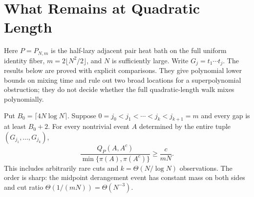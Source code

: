 \section{What Remains at Quadratic Length}
\label{sec:quadratic-diagnostics}

Here $P=P_{N,m}$ is the half-lazy adjacent pair heat bath on the full
uniform identity fiber, $m=2\lfloor N^2/2\rfloor$, and $N$ is sufficiently
large.  Write $G_j=t_1\cdots t_j$.  The results below are proved with
explicit comparisons.  They give polynomial lower bounds on mixing time
and rule out two broad locations for a superpolynomial obstruction; they
do not decide whether the full quadratic-length walk mixes polynomially.

\begin{theorem}
\label{thm:spaced-prefix-cuts}
Put $B_0=\lceil4N\log N\rceil$.  Suppose
$0=j_0<j_1<\cdots<j_k<j_{k+1}=m$ and every gap is at least $B_0+2$.
For every nontrivial event $A$ determined by the entire tuple
$(G_{j_1},\ldots,G_{j_k})$,
\[
 \frac{Q_P(A,A^c)}{\min\{\pi(A),\pi(A^c)\}}
       \ge\frac{c}{mN}.                            \tag{QD.1}
\]
This includes arbitrarily rare cuts and $k=\Theta(N/\log N)$ observations.
The order is sharp: the midpoint derangement event has constant mass on
both sides and cut ratio $\Theta(1/(mN))=\Theta(N^{-3})$.
\end{theorem}
